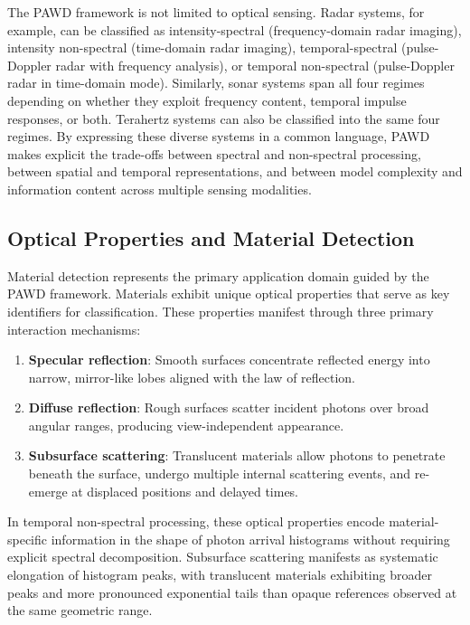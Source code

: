 \documentclass[11pt]{article}
\begin{document}
The PAWD framework is not limited to optical sensing. Radar systems, for example, can be classified as intensity-spectral (frequency-domain radar imaging), intensity non-spectral (time-domain radar imaging), temporal-spectral (pulse-Doppler radar with frequency analysis), or temporal non-spectral (pulse-Doppler radar in time-domain mode). Similarly, sonar systems span all four regimes depending on whether they exploit frequency content, temporal impulse responses, or both. Terahertz systems can also be classified into the same four regimes. By expressing these diverse systems in a common language, PAWD makes explicit the trade-offs between spectral and non-spectral processing, between spatial and temporal representations, and between model complexity and information content across multiple sensing modalities.

\subsection{Optical Properties and Material Detection}

Material detection represents the primary application domain guided by the PAWD framework. Materials exhibit unique optical properties that serve as key identifiers for classification. These properties manifest through three primary interaction mechanisms:

\begin{enumerate}
    \item \textbf{Specular reflection}: Smooth surfaces concentrate reflected energy into narrow, mirror-like lobes aligned with the law of reflection.
    \item \textbf{Diffuse reflection}: Rough surfaces scatter incident photons over broad angular ranges, producing view-independent appearance.
    \item \textbf{Subsurface scattering}: Translucent materials allow photons to penetrate beneath the surface, undergo multiple internal scattering events, and re-emerge at displaced positions and delayed times.
\end{enumerate}

In temporal non-spectral processing, these optical properties encode material-specific information in the shape of photon arrival histograms without requiring explicit spectral decomposition. Subsurface scattering manifests as systematic elongation of histogram peaks, with translucent materials exhibiting broader peaks and more pronounced exponential tails than opaque references observed at the same geometric range.
\end{document}
